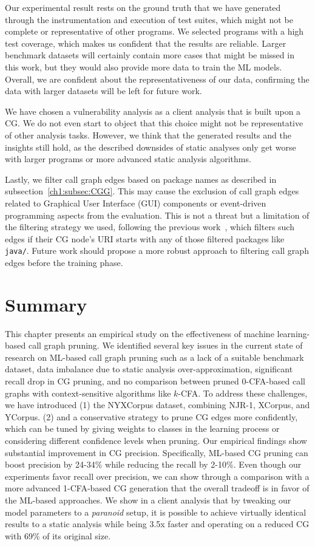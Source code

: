 Our experimental result rests on the ground truth that we have generated through the instrumentation and execution of test suites, which might not be complete or representative of other programs.
We selected programs with a high test coverage, which makes us confident that the results are reliable. Larger benchmark datasets will certainly contain more cases that might be missed in this work, but they would also provide more data to train the ML models.
Overall, we are confident about the representativeness of our data, confirming the data with larger datasets will be left for future work.

We have chosen a vulnerability analysis as a client analysis that is built upon a CG. We do not even start to object that this choice might not be representative of other analysis tasks. However, we think that the generated results and the insights still hold, as the described downsides of static analyses only get worse with larger programs or more advanced static analysis algorithms.

Lastly, we filter call graph edges based on package names as described in subsection~\ref{ch1:subsec:CGG}. This may cause the exclusion of call graph edges related to Graphical User Interface (GUI) components or event-driven programming aspects from the evaluation. This is not a threat but a limitation of the filtering strategy we used, following the previous work~\cite{le2022autopruner, utture2022striking}, which filters such edges if their CG node's URI starts with any of those filtered packages like \texttt{java/}. Future work should propose a more robust approach to filtering call graph edges before the training phase.

\section{Summary}\label{ch1:sec:summary}
This chapter presents an empirical study on the effectiveness of machine learning-based call graph pruning. We identified several key issues in the current state of research on ML-based call graph pruning such as a lack of a suitable benchmark dataset, data imbalance due to static analysis over-approximation, significant recall drop in CG pruning, and no comparison between pruned 0-CFA-based call graphs with context-sensitive algorithms like $k$-CFA.
To address these challenges, we have introduced
(1) the NYXCorpus dataset, combining NJR-1, XCorpus, and YCorpus.
(2) and a conservative strategy to prune CG edges more confidently, which can be tuned by giving weights to classes in the learning process or considering different confidence levels when pruning.
Our empirical findings show substantial improvement in CG precision.
Specifically, ML-based CG pruning can boost precision by 24-34\% while reducing the recall by 2-10\%.
Even though our experiments favor recall over precision, we can show through a comparison with a more advanced 1-CFA-based CG generation that the overall tradeoff is in favor of the ML-based approaches.
We show in a client analysis that by tweaking our model parameters to a \emph{paranoid} setup, it is possible to achieve virtually identical results to a static analysis while being 3.5x faster and operating on a reduced CG with 69\% of its original size.